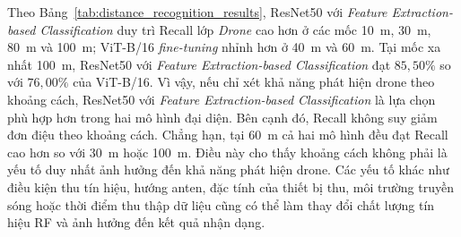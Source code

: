 \documentclass[../DoAn.tex]{subfiles}
\begin{document}
\begin{table}[H]
    \centering
    \renewcommand{\arraystretch}{1.25}
    \small
    \setlength{\tabcolsep}{5pt}
    \caption{Recall lớp Drone theo khoảng cách của hai mô hình đại diện}
    \label{tab:distance_recognition_results}
\end{table}

Theo Bảng~\ref{tab:distance_recognition_results}, ResNet50 với \textit{Feature Extraction-based Classification} duy trì Recall lớp \textit{Drone} cao hơn ở các mốc 10~m, 30~m, 80~m và 100~m; ViT-B/16 \textit{fine-tuning} nhỉnh hơn ở 40~m và 60~m. Tại mốc xa nhất 100~m, ResNet50 với \textit{Feature Extraction-based Classification} đạt $85{,}50\%$ so với $76{,}00\%$ của ViT-B/16. Vì vậy, nếu chỉ xét khả năng phát hiện drone theo khoảng cách, ResNet50 với \textit{Feature Extraction-based Classification} là lựa chọn phù hợp hơn trong hai mô hình đại diện. Bên cạnh đó, Recall không suy giảm đơn điệu theo khoảng cách. Chẳng hạn, tại 60~m cả hai mô hình đều đạt Recall cao hơn so với 30~m hoặc 100~m. Điều này cho thấy khoảng cách không phải là yếu tố duy nhất ảnh hưởng đến khả năng phát hiện drone. Các yếu tố khác như điều kiện thu tín hiệu, hướng anten, đặc tính của thiết bị thu, môi trường truyền sóng hoặc thời điểm thu thập dữ liệu cũng có thể làm thay đổi chất lượng tín hiệu RF và ảnh hưởng đến kết quả nhận dạng.
\end{document}
